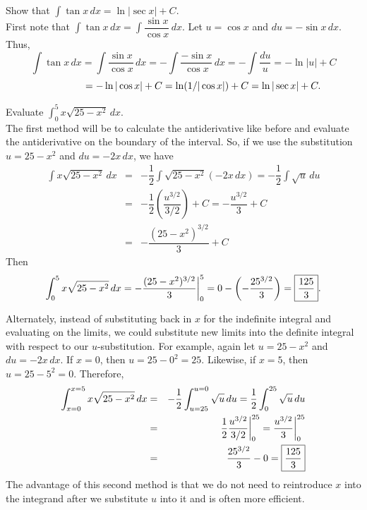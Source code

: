 \documentclass{book}
\newcommand{\dx}{\,dx}
\newcommand{\du}{\,du}
\newcommand{\dint}{\displaystyle \int}
\begin{document}
\begin{Exam} Show that $\dint \tan x\dx = \ln|\sec x| + C$.\\

First note that $\dint \tan x\dx = \int \dfrac{\sin x}{\cos x}\dx$. Let $u = \cos x$ and $du = -\sin x \dx$. Thus, 
\[\int \tan x \dx = \int \dfrac{\sin x}{\cos x}\dx = -\int \dfrac{-\sin x}{\cos x}\dx = -\int \dfrac{du}{u} = - \ln |u| + C\]
\[\hspace{0.55 in} = -\ln|\cos x| + C = \ln(1/|\cos x|) + C = \ln|\sec x| + C. \]
\end{Exam}\vs

\begin{Exam} Evaluate $\dint_0^5 x\sqrt{25-x^2}\dx$.\\

The first method will be to calculate the antiderivative like before and evaluate the antiderivative on the boundary of the interval. So, if we use the substitution $u = 25-x^2$ and $du = -2x\dx$, we have 
\begin{eqnarray*}
\int x\sqrt{25-x^2}\dx &=& -\dfrac{1}{2} \int \sqrt{25-x^2}(-2x\dx)  = -\dfrac{1}{2}\int \sqrt{u}\du\\
&=& -\dfrac{1}{2}\left(\dfrac{u^{3/2}}{3/2}\right) + C = - \dfrac{u^{3/2}}{3} + C\\
&=& -\dfrac{(25-x^2)^{3/2}}{3} + C
\end{eqnarray*} Then \[\int_0^5 x\sqrt{25-x^2}\dx  = -\dfrac{(25-x^2)^{3/2}}{3}\bigg|_0^5 = 0 - \left(-\dfrac{25^{3/2}}{3}\right) = \fbox{$\dfrac{125}{3}$}.\]\vs

Alternately, instead of substituting back in $x$ for the indefinite integral and evaluating on the limits, we could substitute new limits into the definite integral with respect to our $u$-substitution. For example, again let $u = 25-x^2$ and $du = -2x\dx$. If $x = 0$, then $u = 25- 0^2 = 25$. Likewise, if $x= 5$, then $u = 25-5^2 = 0$. Therefore, 
\begin{eqnarray*}
\int_{x=0}^{x=5} x\sqrt{25-x^2}\dx &=& -\dfrac{1}{2}\int_{u=25}^{u=0} \sqrt{u}\du = \dfrac{1}{2}\int_0^{25} \sqrt{u}\du\\
&=& \dfrac{1}{2}\dfrac{u^{3/2}}{3/2}\bigg|_0^{25} = \dfrac{u^{3/2}}{3}\bigg|_0^{25}\\
&=& \dfrac{25^{3/2}}{3} - 0 = \fbox{$\dfrac{125}{3}$}
\end{eqnarray*} The advantage of this second method is that we do not need to reintroduce $x$ into the integrand after we substitute $u$ into it and is often more efficient.
\end{Exam}\vs
\end{document}
